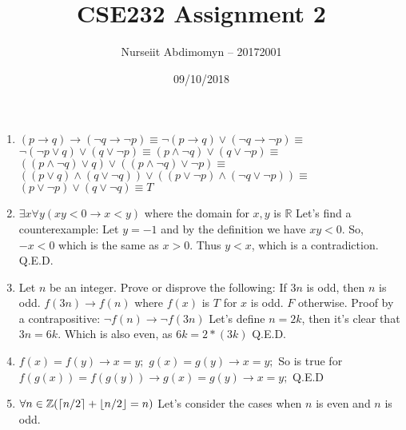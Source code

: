 \documentclass[12pt]{article}
\title{CSE232 Assignment 2}
\author{Nurseiit Abdimomyn -- 20172001}
\date{09/10/2018}
\DeclarePairedDelimiter{\ceil}{\lceil}{\rceil}
\DeclarePairedDelimiter{\floor}{\lfloor}{\rfloor}
\begin{document}
\maketitle

\begin{enumerate}
  \item
    $(p \to q) \to (\neg q \to \neg p) \equiv \neg (p \to q) \lor (\neg q \to \neg p) \equiv$
    \newline
    $\neg (\neg p \lor q) \lor (q \lor \neg p) \equiv (p \land \neg q) \lor (q \lor \neg p) \equiv$
    \newline
    $((p \land \neg q) \lor q) \lor ((p \land \neg q) \lor \neg p) \equiv$
    \newline
    $((p \lor q) \land (q \lor \neg q)) \lor ((p \lor \neg p) \land (\neg q \lor \neg p)) \equiv$
    \newline
    $(p \lor \neg p) \lor (q \lor \neg q) \equiv T$
  \item
    $\exists x \forall y (xy < 0 \to x < y)$ where the domain for $x, y$ is $\mathbb{R}$
    \newline
    Let's find a counterexample:
    \newline
    Let $y = -1$ and by the definition we have $xy < 0$. So, $-x < 0$ which is the same as $x > 0$. Thus $y < x$, which is a contradiction. Q.E.D.
  \item
    Let $n$ be an integer.  Prove or disprove the following:  If $3n$ is odd, then $n$ is odd.
    \newline
    $f(3n) \to f(n)$ where $f(x)$ is $T$ for $x$ is odd. $F$ otherwise.
    \newline \newline
    Proof by a contrapositive:
    \newline
    $\neg f(n) \to \neg f(3n)$
    \newline
    Let's define $n = 2k$, then it's clear that $3n = 6k$. Which is also even, as $6k = 2*(3k)$ Q.E.D.
  \item
    $f(x) = f(y) \to x = y;$ \newline
    $g(x) = g(y) \to x = y;$ \newline
    So is true for $f(g(x)) = f(g(y)) \to g(x) = g(y) \to x = y;$ \newline
    Q.E.D
  \item
    $\forall n \in \mathbb{Z} (\ceil{n/2} + \floor{n/2} = n)$ \newline
    Let's consider the cases when $n$ is even and $n$ is odd. \newline \newline

\end{enumerate}
\end{document}
